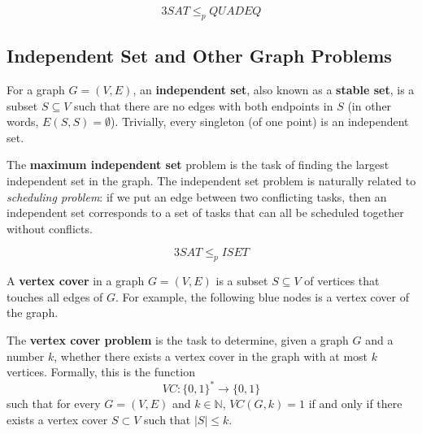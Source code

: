 \documentclass{article}
\begin{document}
  \begin{theorem}
  \[3SAT \leq_p QUADEQ\]
  \end{theorem}

  \subsection{Independent Set and Other Graph Problems}
  \begin{definition}
  For a graph $G = (V, E)$, an \textbf{independent set}, also known as a \textbf{stable set}, is a subset $S \subseteq V$ such that there are no edges with both endpoints in $S$ (in other words, $E(S, S) = \emptyset$). Trivially, every singleton (of one point) is an independent set. 
  \end{definition}

  The \textbf{maximum independent set} problem is the task of finding the largest independent set in the graph. The independent set problem is naturally related to \textit{scheduling problem}: if we put an edge between two conflicting tasks, then an independent set corresponds to a set of tasks that can all be scheduled together without conflicts. 

  \begin{theorem}
  \[3SAT \leq_p ISET\]
  \end{theorem}

  \begin{definition}
  A \textbf{vertex cover} in a graph $G = (V, E)$ is a subset $S \subseteq V$ of vertices that touches all edges of $G$. For example, the following blue nodes is a vertex cover of the graph. 
  \begin{center}
  \end{center}

  The \textbf{vertex cover problem} is the task to determine, given a graph $G$ and a number $k$, whether there exists a vertex cover in the graph with at most $k$ vertices. Formally, this is the function 
  \[VC: \{0,1\}^* \longrightarrow \{0,1\}\]
  such that for every $G = (V, E)$ and $k \in \mathbb{N}$, $VC(G, k) = 1$ if and only if there exists a vertex cover $S \subset V$ such that $|S| \leq k$. 
  \end{definition}
\end{document}
